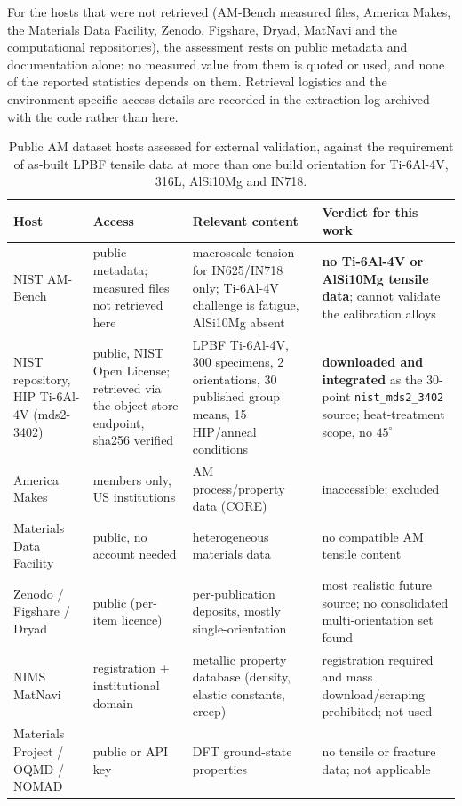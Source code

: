 \documentclass[11pt,a4paper,twocolumn]{article}
\providecommand{\ang}[1]{\ensuremath{#1^{\circ}}}
\begin{document}
For the hosts that were not retrieved (AM-Bench measured files, America Makes, the Materials Data Facility, Zenodo, Figshare, Dryad, MatNavi and the computational repositories), the assessment rests on public metadata and documentation alone: no measured value from them is quoted or used, and none of the reported statistics depends on them. Retrieval logistics and the environment-specific access details are recorded in the extraction log archived with the code rather than here.

\begin{table}[htbp]
\centering
\caption{Public AM dataset hosts assessed for external validation, against the requirement of as-built
LPBF tensile data at more than one build orientation for Ti-6Al-4V, 316L, AlSi10Mg and IN718.}
\label{tab:public_datasets}
\footnotesize
\setlength{\tabcolsep}{4pt}
\begin{tabular}{p{}p{}p{}p{}}
\toprule
\textbf{Host} & \textbf{Access} & \textbf{Relevant content} & \textbf{Verdict for this work} \\
\midrule
NIST AM-Bench & public metadata; measured files not retrieved here & macroscale tension for IN625/IN718 only; Ti-6Al-4V challenge is fatigue, AlSi10Mg absent & \textbf{no Ti-6Al-4V or AlSi10Mg tensile data}; cannot validate the calibration alloys \\
NIST repository, HIP Ti-6Al-4V (mds2-3402) & public, NIST Open License; retrieved via the object-store endpoint, sha256 verified & LPBF Ti-6Al-4V, 300 specimens, 2 orientations, 30 published group means, 15 HIP/anneal conditions & \textbf{downloaded and integrated} as the 30-point \texttt{nist\_mds2\_3402} source; heat-treatment scope, no $\ang{45}$ \\
America Makes & members only, US institutions & AM process/property data (CORE) & inaccessible; excluded \\
Materials Data Facility & public, no account needed & heterogeneous materials data & no compatible AM tensile content \\
Zenodo / Figshare / Dryad & public (per-item licence) & per-publication deposits, mostly single-orientation & most realistic future source; no consolidated multi-orientation set found \\
NIMS MatNavi & registration + institutional domain & metallic property database (density, elastic constants, creep) & registration required and mass download/scraping prohibited; not used \\
Materials Project / OQMD / NOMAD & public or API key & DFT ground-state properties & no tensile or fracture data; not applicable \\
\bottomrule
\end{tabular}
\end{table}
\end{document}
